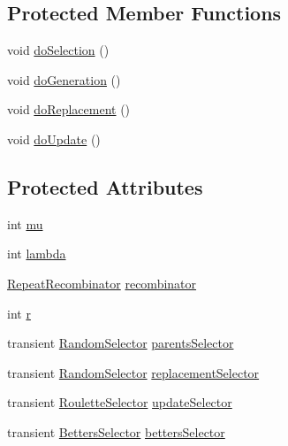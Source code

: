 \subsection*{Protected Member Functions}
\begin{DoxyCompactItemize}
\item 
void \hyperlink{classnet_1_1sf_1_1jclec_1_1algorithm_1_1gengap_1_1_g3_ad03cfbc667a5d79751ca91410e1f4b35}{do\-Selection} ()
\item 
void \hyperlink{classnet_1_1sf_1_1jclec_1_1algorithm_1_1gengap_1_1_g3_a423dbceb7b8ba0580aee18d982fbd428}{do\-Generation} ()
\item 
void \hyperlink{classnet_1_1sf_1_1jclec_1_1algorithm_1_1gengap_1_1_g3_afd9e833c748f22790598dba7ec39cedb}{do\-Replacement} ()
\item 
void \hyperlink{classnet_1_1sf_1_1jclec_1_1algorithm_1_1gengap_1_1_g3_ade2342ab60873a250aab76eb522b5948}{do\-Update} ()
\end{DoxyCompactItemize}
\subsection*{Protected Attributes}
\begin{DoxyCompactItemize}
\item 
int \hyperlink{classnet_1_1sf_1_1jclec_1_1algorithm_1_1gengap_1_1_g3_aa4ddf4a074688412a3fe669aac3283a1}{mu}
\item 
int \hyperlink{classnet_1_1sf_1_1jclec_1_1algorithm_1_1gengap_1_1_g3_ad0bae64a81015d9bfd89a37a1273ae05}{lambda}
\item 
\hyperlink{classnet_1_1sf_1_1jclec_1_1base_1_1_repeat_recombinator}{Repeat\-Recombinator} \hyperlink{classnet_1_1sf_1_1jclec_1_1algorithm_1_1gengap_1_1_g3_a079407128e3e5eb01b3777e5e7a9c488}{recombinator}
\item 
int \hyperlink{classnet_1_1sf_1_1jclec_1_1algorithm_1_1gengap_1_1_g3_ab4b67f3578c57a6c888a620f90d02c0e}{r}
\item 
transient \hyperlink{classnet_1_1sf_1_1jclec_1_1selector_1_1_random_selector}{Random\-Selector} \hyperlink{classnet_1_1sf_1_1jclec_1_1algorithm_1_1gengap_1_1_g3_a57dd3e0c92be45cb3ab1601a2b216da5}{parents\-Selector}
\item 
transient \hyperlink{classnet_1_1sf_1_1jclec_1_1selector_1_1_random_selector}{Random\-Selector} \hyperlink{classnet_1_1sf_1_1jclec_1_1algorithm_1_1gengap_1_1_g3_ae51e516d5ceb1f80ae931bce9319d255}{replacement\-Selector}
\item 
transient \hyperlink{classnet_1_1sf_1_1jclec_1_1selector_1_1_roulette_selector}{Roulette\-Selector} \hyperlink{classnet_1_1sf_1_1jclec_1_1algorithm_1_1gengap_1_1_g3_ac9eb67ba0b3d5f8a0301e9df03ec5130}{update\-Selector}
\item 
transient \hyperlink{classnet_1_1sf_1_1jclec_1_1selector_1_1_betters_selector}{Betters\-Selector} \hyperlink{classnet_1_1sf_1_1jclec_1_1algorithm_1_1gengap_1_1_g3_aeec51201a8db026697691e93b2c8b026}{betters\-Selector}
\end{DoxyCompactItemize}


